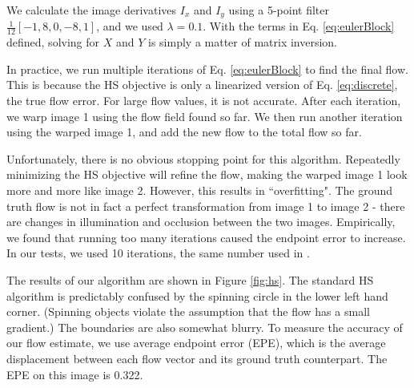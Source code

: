 \documentclass[10pt,twocolumn,letterpaper]{article}
\begin{document}
We calculate the image derivatives $I_x$ and $I_y$ using a 5-point filter $\frac{1}{12}[-1, 8, 0, -8, 1]$, and we used $\lambda = 0.1$.  With the terms in Eq. \ref{eq:eulerBlock} defined, solving for $X$ and $Y$ is simply a matter of matrix inversion.

In practice, we run multiple iterations of Eq. \ref{eq:eulerBlock} to find the final flow.  This is because the HS objective is only a linearized version of Eq. \ref{eq:discrete}, the true flow error.  For large flow values, it is not accurate.  After each iteration, we warp image 1 using the flow field found so far.  We then run another iteration using the warped image 1, and add the new flow to the total flow so far.

Unfortunately, there is no obvious stopping point for this algorithm.  Repeatedly minimizing the HS objective will refine the flow, making the warped image 1 look more and more like image 2.  However, this results in ``overfitting".  The ground truth flow is not in fact a perfect transformation from image 1 to image 2 - there are changes in illumination and occlusion between the two images.  Empirically, we found that running too many iterations caused the endpoint error to increase.  In our tests, we used 10 iterations, the same number used in \cite{sun}.

The results of our algorithm are shown in Figure \ref{fig:hs}.  The standard HS algorithm is predictably confused by the spinning circle in the lower left hand corner.  (Spinning objects violate the assumption that the flow has a small gradient.)  The boundaries are also somewhat blurry.  To measure the accuracy of our flow estimate, we use average endpoint error (EPE), which is the average displacement between each flow vector and its ground truth counterpart.  The EPE on this image is 0.322.
\end{document}
